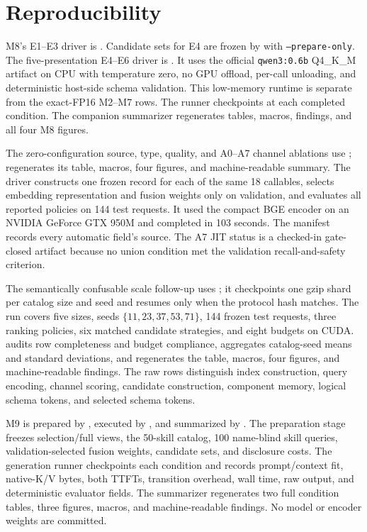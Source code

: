 \section{Reproducibility}
M8's E1--E3 driver is . Candidate sets for E4
are frozen by  with
\texttt{--prepare-only}. The five-presentation E4--E6 driver is
. It uses the official
\texttt{qwen3:0.6b} Q4\_K\_M artifact on CPU with temperature zero, no GPU
offload, per-call unloading, and deterministic host-side schema validation.
This low-memory runtime is separate from the exact-FP16 M2--M7 rows. The runner
checkpoints at each completed condition. The companion summarizer regenerates
tables, macros, findings, and all four M8 figures.

The zero-configuration source, type, quality, and A0--A7 channel ablations use
;
 regenerates its table, macros, four
figures, and machine-readable summary. The driver constructs one frozen record
for each of the same 18 callables, selects embedding representation and fusion
weights only on validation, and evaluates all reported policies on 144 test
requests. It used the compact BGE encoder on an NVIDIA GeForce GTX 950M and
completed in 103 seconds. The manifest records every automatic field's source.
The A7 JIT status is a checked-in gate-closed artifact because no union condition
met the validation recall-and-safety criterion.

The semantically confusable scale follow-up uses
; it checkpoints one gzip shard per catalog
size and seed and resumes only when the protocol hash matches. The run covers
five sizes, seeds $\{11,23,37,53,71\}$, 144 frozen test requests, three ranking
policies, six matched candidate strategies, and eight budgets on CUDA.
 audits row completeness and budget
compliance, aggregates catalog-seed means and standard deviations, and
regenerates the table, macros, four figures, and machine-readable findings.
The raw rows distinguish index construction, query encoding, channel scoring,
candidate construction, component memory, logical schema tokens, and selected
schema tokens.

M9 is prepared by , executed by
, and summarized by
. The preparation stage freezes
selection/full views, the 50-skill catalog, 100 name-blind skill queries,
validation-selected fusion weights, candidate sets, and disclosure costs. The
generation runner checkpoints each condition and records prompt/context fit,
native-K/V bytes, both TTFTs, transition overhead, wall time, raw output, and
deterministic evaluator fields. The summarizer regenerates two full condition
tables, three figures, macros, and machine-readable findings. No model or
encoder weights are committed.

